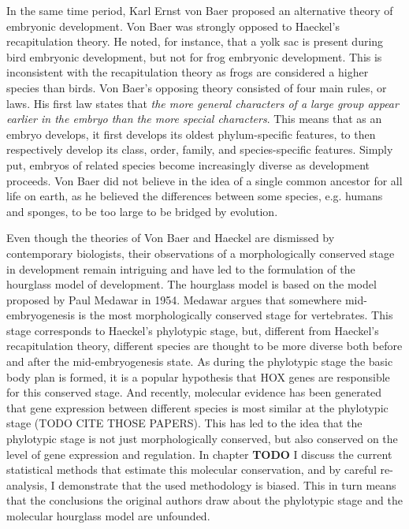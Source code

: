 In the same time period, Karl Ernst von Baer proposed an alternative theory of embryonic development. Von Baer was strongly opposed to Haeckel's recapitulation theory. He noted, for instance, that a yolk sac is present during bird embryonic development, but not for frog embryonic development. This is inconsistent with the recapitulation theory as frogs are considered a higher species than birds. Von Baer's opposing theory consisted of four main rules, or laws\cite{baer1828}. His first law states that \textit{the more general characters of a large group appear earlier in the embryo than the more special characters}. This means that as an embryo develops, it first develops its oldest phylum-specific features, to then respectively develop its class, order, family, and species-specific features. Simply put, embryos of related species become increasingly diverse as development proceeds. Von Baer did not believe in the idea of a single common ancestor for all life on earth, as he believed the differences between some species, e.g. humans and sponges, to be too large to be bridged by evolution.

Even though the theories of Von Baer and Haeckel are dismissed by contemporary biologists, their observations of a morphologically conserved stage in development remain intriguing and have led to the formulation of the hourglass model of development. The hourglass model is based on the model proposed by Paul Medawar in 1954\cite{Medawar1954}. Medawar argues that somewhere mid-embryogenesis is the most morphologically conserved stage for vertebrates. This stage corresponds to Haeckel's phylotypic stage, but, different from Haeckel's recapitulation theory, different species are thought to be more diverse both before and after the mid-embryogenesis state. As during the phylotypic stage the basic body plan is formed, it is a popular hypothesis that HOX genes are responsible for this conserved stage. And recently, molecular evidence has been generated that gene expression between different species is most similar at the phylotypic stage (TODO CITE THOSE PAPERS). This has led to the idea that the phylotypic stage is not just morphologically conserved, but also conserved on the level of gene expression and regulation. In chapter \textbf{TODO} I discuss the current statistical methods that estimate this molecular conservation, and by careful re-analysis, I demonstrate that the used methodology is biased. This in turn means that the conclusions the original authors draw about the phylotypic stage and the molecular hourglass model are unfounded. 

